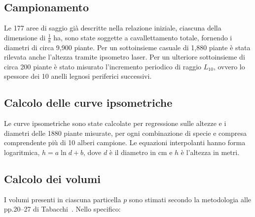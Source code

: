 \documentclass[a4paper,11pt]{article}
\begin{document}
\subsection{Campionamento}

Le 177 aree di saggio già descritte nella relazione iniziale, ciascuna della dimensione di $\frac{1}{8}$ ha, sono state soggette a cavallettamento totale, fornendo i diametri di circa 9,900 piante. Per un sottoinsieme casuale di 1,880 piante è stata rilevata anche l'altezza tramite ipsometro laser. Per un ulteriore sottoinsieme di circa 200 piante è stato misurato l'incremento periodico di raggio $L_{10}$, ovvero lo spessore dei 10 anelli legnosi periferici successivi.

\subsection{Calcolo delle curve ipsometriche}
\label{sec:note:ipsometrie}
Le curve ipsometriche sono state calcolate per regressione sulle altezze e i diametri delle 1880 piante misurate, per ogni combinazione di specie e compresa comprendente più di 10 alberi campione. Le equazioni interpolanti hanno forma logaritmica, $h = a \ln d + b$, dove $d$ è il diametro in cm e $h$ è l'altezza in metri.

\subsection{Calcolo dei volumi}
\label{sec:note-volumi}

I volumi presenti in ciascuna particella $p$ sono stimati secondo la metodologia alle pp.20--27 di Tabacchi~\cite{tabacchi:2011}. Nello specifico:
\end{document}
